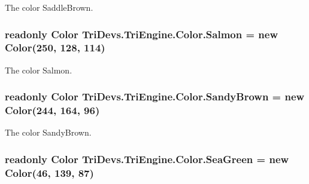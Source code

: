 The color Saddle\-Brown. 

\hypertarget{struct_tri_devs_1_1_tri_engine_1_1_color_a8030da2e0fdf0ec5139f69655544cb03}{
\subsubsection[{Salmon}]{\setlength{\rightskip}{0pt plus 5cm}readonly {\bf Color} Tri\-Devs.\-Tri\-Engine.\-Color.\-Salmon = new {\bf Color}(250, 128, 114)\hspace{0.3cm}{\ttfamily [static]}}}\label{struct_tri_devs_1_1_tri_engine_1_1_color_a8030da2e0fdf0ec5139f69655544cb03}


The color Salmon. 

\hypertarget{struct_tri_devs_1_1_tri_engine_1_1_color_a2906f55d9a017b3f472a312d26852c3a}{
\subsubsection[{Sandy\-Brown}]{\setlength{\rightskip}{0pt plus 5cm}readonly {\bf Color} Tri\-Devs.\-Tri\-Engine.\-Color.\-Sandy\-Brown = new {\bf Color}(244, 164, 96)\hspace{0.3cm}{\ttfamily [static]}}}\label{struct_tri_devs_1_1_tri_engine_1_1_color_a2906f55d9a017b3f472a312d26852c3a}


The color Sandy\-Brown. 

\hypertarget{struct_tri_devs_1_1_tri_engine_1_1_color_a522c4eb74ab80155a696752910e1c09c}{
\subsubsection[{Sea\-Green}]{\setlength{\rightskip}{0pt plus 5cm}readonly {\bf Color} Tri\-Devs.\-Tri\-Engine.\-Color.\-Sea\-Green = new {\bf Color}(46, 139, 87)\hspace{0.3cm}{\ttfamily [static]}}}\label{struct_tri_devs_1_1_tri_engine_1_1_color_a522c4eb74ab80155a696752910e1c09c}


